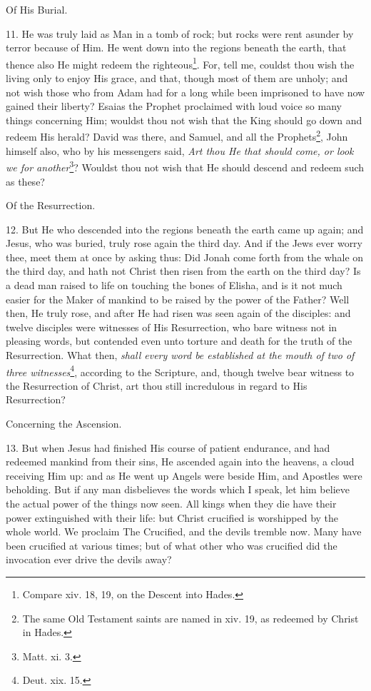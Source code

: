 Of His Burial.

11. He was truly laid as Man in a tomb of rock; but rocks were rent asunder by terror because of Him. He went down into the regions beneath the earth, that thence also He might redeem the righteous\footnote{Compare xiv. 18, 19, on the Descent into Hades.}. For, tell me, couldst thou wish the living only to enjoy His grace, and that, though most of them are unholy; and not wish those who from Adam had for a long while been imprisoned to have now gained their liberty? Esaias the Prophet proclaimed with loud voice so many things concerning Him; wouldst thou not wish that the King should go down and redeem His herald? David was there, and Samuel, and all the Prophets\footnote{The same Old Testament saints are named in xiv. 19, as redeemed by Christ in Hades.}, John himself also, who by his messengers said, \emph{Art thou He that should come, or look we for another}\footnote{Matt. xi. 3.}? Wouldst thou not wish that He should descend and redeem such as these?

Of the Resurrection.

12. But He who descended into the regions beneath the earth came up again; and Jesus, who was buried, truly rose again the third day. And if the Jews ever worry thee, meet them at once by asking thus: Did Jonah come forth from the whale on the third day, and hath not Christ then risen from the earth on the third day? Is a dead man raised to life on touching the bones of Elisha, and is it not much easier for the Maker of mankind to be raised by the power of the Father? Well then, He truly rose, and after He had risen was seen again of the disciples: and twelve disciples were witnesses of His Resurrection, who bare witness not in pleasing words, but contended even unto torture and death for the truth of the Resurrection. What then, \emph{shall every word be established at the mouth of two of three witnesses}\footnote{Deut. xix. 15.}, according to the Scripture, and, though twelve bear witness to the Resurrection of Christ, art thou still incredulous in regard to His Resurrection?

Concerning the Ascension.

13. But when Jesus had finished His course of patient endurance, and had redeemed mankind from their sins, He ascended again into the heavens, a cloud receiving Him up: and as He went up Angels were beside Him, and Apostles were beholding. But if any man disbelieves the words which I speak, let him believe the actual power of the things now seen. All kings when they die have their power extinguished with their life: but Christ crucified is worshipped by the whole world. We proclaim The Crucified, and the devils tremble now. Many have been crucified at various times; but of what other who was crucified did the invocation ever drive the devils away?

